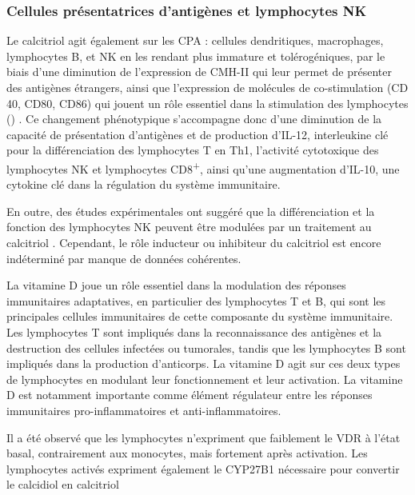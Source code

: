 \documentclass[
  a4paper,
  DIV=11,
  numbers=noendperiod,
  listof=totoc]{scrreprt}
\begin{document}
\subsubsection{Cellules présentatrices d'antigènes et lymphocytes
NK}\label{cellules-pruxe9sentatrices-dantiguxe8nes-et-lymphocytes-nk}

Le calcitriol agit également sur les \ac{CPA} : cellules dendritiques,
macrophages, lymphocytes B, et \ac{NK} en les rendant plus immature et
tolérogéniques, par le biais d'une diminution de l'expression de
\ac{CMH-II} qui leur permet de présenter des antigènes étrangers, ainsi
que l'expression de molécules de co-stimulation (\ac{CD} 40, CD80, CD86)
qui jouent un rôle essentiel dans la stimulation des lymphocytes
()
\autocite{Charoenngam.2020,Meza-Meza.2022,Caprio.2017}. Ce changement
phénotypique s'accompagne donc d'une diminution de la capacité de
présentation d'antigènes et de production d'\ac{IL-12}, interleukine clé
pour la différenciation des lymphocytes T en Th1, l'activité cytotoxique
des lymphocytes \ac{NK} et lymphocytes CD8\textsuperscript{+}, ainsi
qu'une augmentation d'\ac{IL-10}, une cytokine clé dans la régulation du
système immunitaire.

En outre, des études expérimentales ont suggéré que la différenciation
et la fonction des lymphocytes \ac{NK} peuvent être modulées par un
traitement au calcitriol \autocite{Charoenngam.2020}. Cependant, le rôle
inducteur ou inhibiteur du calcitriol est encore indéterminé par manque
de données cohérentes.

La vitamine D joue un rôle essentiel dans la modulation des réponses
immunitaires adaptatives, en particulier des lymphocytes T et B, qui
sont les principales cellules immunitaires de cette composante du
système immunitaire. Les lymphocytes T sont impliqués dans la
reconnaissance des antigènes et la destruction des cellules infectées ou
tumorales, tandis que les lymphocytes B sont impliqués dans la
production d'anticorps. La vitamine D agit sur ces deux types de
lymphocytes en modulant leur fonctionnement et leur activation. La
vitamine D est notamment importante comme élément régulateur entre les
réponses immunitaires pro-inflammatoires et anti-inflammatoires.

Il a été observé que les lymphocytes n'expriment que faiblement le
\ac{VDR} à l'état basal, contrairement aux monocytes, mais fortement
après activation. Les lymphocytes activés expriment également le
\ac{CYP27B1} nécessaire pour convertir le calcidiol en calcitriol
\autocite{Charoengramm.2020}
\end{document}
